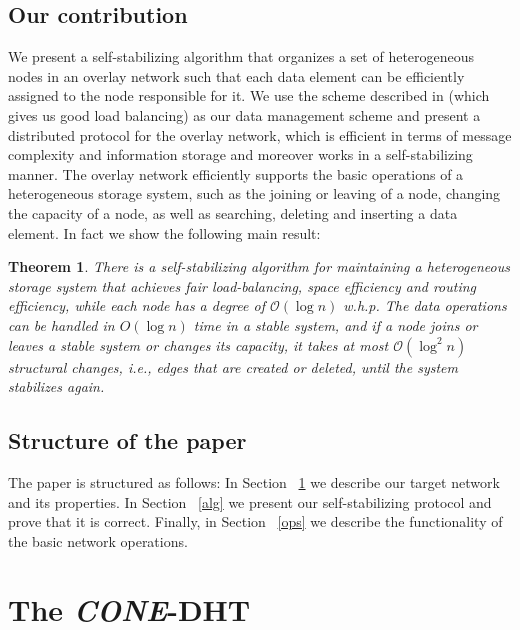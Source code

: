 \documentclass[11pt]{article}
\newtheorem{theorem}{Theorem}[section]
\begin{document}
\subsection{Our contribution}

We present a self-stabilizing algorithm that organizes a set of heterogeneous
nodes in an overlay network such that each data element can be efficiently
assigned to the node responsible for it. We use the scheme described in
\cite{cone} (which gives us good load balancing) as our data management scheme
and present a distributed protocol for the overlay network, which is efficient
in terms of message complexity and information storage and moreover works in a
self-stabilizing manner. The overlay network efficiently supports the basic
operations of a heterogeneous storage system, such as the joining or leaving
of a node, changing the capacity of a node, as well as searching, deleting and
inserting a data element. In fact we show the following main result:

\begin{theorem}\label{theo:main}
There is a self-stabilizing algorithm for maintaining a heterogeneous storage
system that achieves fair load-balancing, space efficiency and routing
efficiency, while each node has a degree of $\mathcal O(\log n)$ w.h.p. The
data operations can be handled in $O(\log n)$ time in a stable system, and if
a node joins or leaves a stable system or changes its capacity, it takes at
most $\mathcal O(\log^2 n)$ structural changes, i.e., edges that are created
or deleted, until the system stabilizes again.
\end{theorem}

\subsection{Structure of the paper}

The paper is structured as follows: In Section ~\ref{cone-dht} we describe our target network and its properties.
In Section ~\ref{alg} we present our self-stabilizing protocol and prove that
it is correct. Finally, in Section ~\ref{ops} we describe the functionality of
the basic network operations.





\section{The \emph{CONE}-DHT}\label{cone-dht}
\end{document}
